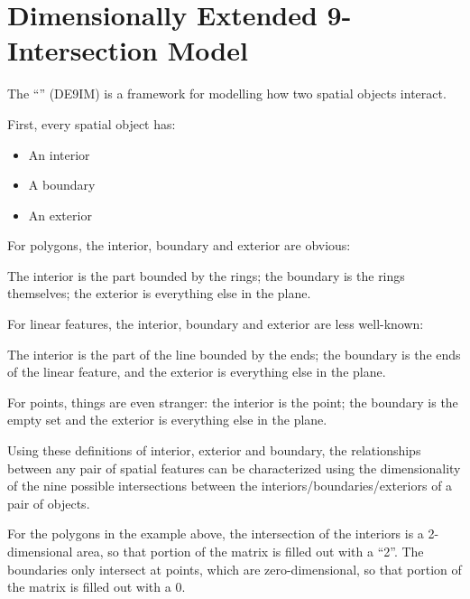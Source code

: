 \documentclass[a4paper,11pt,english]{sphinxmanual}
\begin{document}
\section{Dimensionally Extended 9-Intersection Model}
\label{\detokenize{advanced:dimensionally-extended-9-intersection-model}}\label{\detokenize{advanced:de9im}}
The “” (DE9IM) is a framework for modelling how two spatial objects interact.

First, every spatial object has:
\begin{itemize}
\item {} 
An interior

\item {} 
A boundary

\item {} 
An exterior

\end{itemize}

For polygons, the interior, boundary and exterior are obvious:

\noindent{}

The interior is the part bounded by the rings; the boundary is the rings themselves; the exterior is everything else in the plane.

For linear features, the interior, boundary and exterior are less well-known:

\noindent{}

The interior is the part of the line bounded by the ends; the boundary is the ends of the linear feature, and the exterior is everything else in the plane.

For points, things are even stranger: the interior is the point; the boundary is the empty set and the exterior is everything else in the plane.

Using these definitions of interior, exterior and boundary, the relationships between any pair of spatial features can be characterized using the dimensionality of the nine possible intersections between the interiors/boundaries/exteriors of a pair of objects.

\noindent{}

For the polygons in the example above, the intersection of the interiors is a 2-dimensional area, so that portion of the matrix is filled out with a “2”. The boundaries only intersect at points, which are zero-dimensional, so that portion of the matrix is filled out with a 0.
\end{document}
